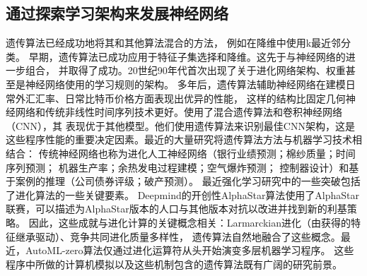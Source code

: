\documentclass[12pt, a4paper, oneside]{ctexart}
\numberwithin{equation}{section}  %
\begin{document}
\subsection{通过探索学习架构来发展神经网络}
遗传算法已经成功地将其和其他算法混合的方法，
例如在降维中使用k最近邻分类\cite{bib-Raymer2000}。
早期，遗传算法已成功应用于特征子集选择\cite{bib-Yang1998}和降维\cite{bib-Raymer2000}。这先于与神经网络的进一步组合，
并取得了成功。20世纪90年代首次出现了关于进化网络架构、权重甚至是神经网络使用的学习规则的架构\cite{bib-Kitano1990,bib-Kitano1994}。
多年后，遗传算法辅助神经网络在建模日常外汇汇率\cite{bib-Waheeb2019}、日常比特币价格\cite{bib-Han2019}方面表现出优异的性能，
这样的结构比固定几何神经网络和传统非线性时间序列技术更好。\cite{bib-Chung2020}使用了混合遗传算法和卷积神经网络（CNN），其
表现优于其他模型。他们使用遗传算法来识别最佳CNN架构，这是这些程序性能的重要决定因素。最近的大量研究将遗传算法方法与机器学习技术相结合：
传统神经网络也称为进化人工神经网络（银行业绩预测\cite{bib-Ravi2008}；棉纱质量\cite{bib-Amin2013}；时间序列预测\cite{bib-Donate2013}；
机器生产率\cite{bib-Azadeh2015}；余热发电过程建模\cite{bib-Braun2016}；空气爆炸预测\cite{bib-Armaghani2018}；
控制器设计\cite{bib-AbdElazim2018}）和基于案例的推理（公司债券评级\cite{bib-Shin1999}；破产预测\cite{bib-Ahn2009}）。
最近强化学习研究中的一些突破包括了进化算法的一些关键要素。
Deepmind的开创性AlphaStar算法\cite{bib-Vinyals2019}使用了AlphaStar联赛，可以描述为AlphaStar版本的人口与其他版本对抗以改进并找到新的利基策略。
因此，这些成就与进化计算的关键概念\cite{bib-Arulkumaran2019}相关：Larmarckian进化（由获得的特征继承驱动）、竞争共同进化质量多样性，
遗传算法自然地融合了这些概念。最近，AutoML-zero算法仅通过进化运算符从头开始演变多层机器学习程序\cite{bib-Real2020}。
这些程序中所做的计算机模拟以及这些机制包含的遗传算法既有广阔的研究前景。
\end{document}
